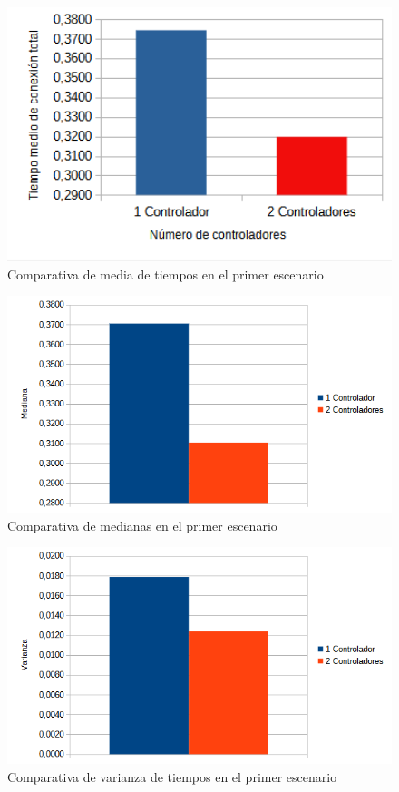 \documentclass[a4paper, 12pt]{book}
\begin{document}
 	\begin{figure}[H]
 		\centering
 		\includegraphics[width=12cm, keepaspectratio]{img/comparativamediasbucle}
 		\caption{Comparativa de media de tiempos en el primer escenario}
 		\label{figura:mediabucle4}
 	\end{figure}
 	
 	\begin{figure}[H]
 		\centering
 		\includegraphics[width=12cm, keepaspectratio]{img/comparativamedianabucle}
 		\caption{Comparativa de medianas en el primer escenario}
 		\label{figura:medianabucle4}
 	\end{figure}
 	
 	\begin{figure}[H]
 		\centering
 		\includegraphics[width=12cm, keepaspectratio]{img/comparativavarianzabucle}
 		\caption{Comparativa de varianza de tiempos en el primer escenario}
 		\label{figura:varianzabucle4}
 	\end{figure}
 	
\end{document}
